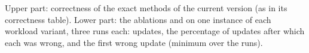\documentclass[10pt]{article}
\begin{document}
\begin{table}[t]
  \centering
  \caption{Upper part: correctness of the exact methods of the current version
    (as in its correctness table). Lower part: the ablations  and
     on one instance of each workload variant, three runs each:
    updates, the percentage of updates after which each was wrong, and the first
    wrong update (minimum over the runs).}
  \label{tab:correctness}
  \small
\end{table}



\end{document}
